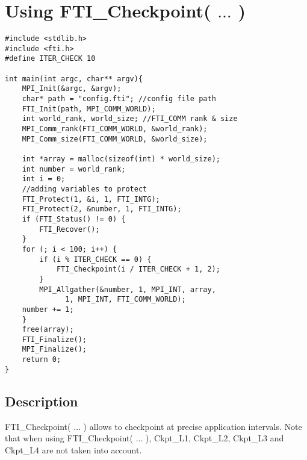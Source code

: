 \documentclass{refrep}
\begin{document}
\section{Using FTI\_Checkpoint( $\dots$ )}\label{sec:usingcheckpoint}
\begin{center}
\begin{lstlisting}[frame=single]
#include <stdlib.h>
#include <fti.h>
#define ITER_CHECK 10

int main(int argc, char** argv){
    MPI_Init(&argc, &argv);
    char* path = "config.fti"; //config file path
    FTI_Init(path, MPI_COMM_WORLD);
    int world_rank, world_size; //FTI_COMM rank & size
    MPI_Comm_rank(FTI_COMM_WORLD, &world_rank);
    MPI_Comm_size(FTI_COMM_WORLD, &world_size);

    int *array = malloc(sizeof(int) * world_size);
    int number = world_rank;
    int i = 0;
    //adding variables to protect
    FTI_Protect(1, &i, 1, FTI_INTG);
    FTI_Protect(2, &number, 1, FTI_INTG);
    if (FTI_Status() != 0) {
        FTI_Recover();
    }
    for (; i < 100; i++) {
        if (i % ITER_CHECK == 0) {
            FTI_Checkpoint(i / ITER_CHECK + 1, 2);
        }
        MPI_Allgather(&number, 1, MPI_INT, array,
		      1, MPI_INT, FTI_COMM_WORLD);
	number += 1;
    }
    free(array);
    FTI_Finalize();
    MPI_Finalize();
    return 0;
}
\end{lstlisting}
\end{center}
\subsection*{Description}
FTI\_Checkpoint( $\dots$ ) allows to checkpoint at precise application intervals. Note that when using FTI\_Checkpoint( $\dots$ ), Ckpt\_L1, Ckpt\_L2, Ckpt\_L3 and Ckpt\_L4 are not taken into account.
\end{document}
